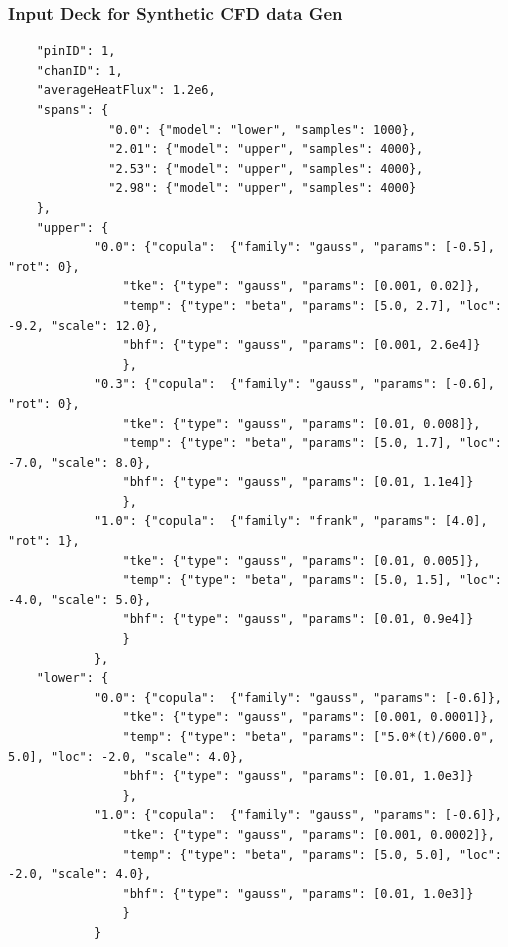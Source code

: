 \documentclass[t, pdftex]{beamer}
\begin{document}
\begin{frame}[fragile,shrink=30]
\frametitle{Input Deck for Synthetic CFD data Gen}
\begin{verbatim}
    "pinID": 1,
    "chanID": 1,
    "averageHeatFlux": 1.2e6,
    "spans": {
              "0.0": {"model": "lower", "samples": 1000},
              "2.01": {"model": "upper", "samples": 4000},
              "2.53": {"model": "upper", "samples": 4000},
              "2.98": {"model": "upper", "samples": 4000}
    },
    "upper": {
            "0.0": {"copula":  {"family": "gauss", "params": [-0.5], "rot": 0},
                "tke": {"type": "gauss", "params": [0.001, 0.02]},
                "temp": {"type": "beta", "params": [5.0, 2.7], "loc": -9.2, "scale": 12.0},
                "bhf": {"type": "gauss", "params": [0.001, 2.6e4]}
                },
            "0.3": {"copula":  {"family": "gauss", "params": [-0.6], "rot": 0},
                "tke": {"type": "gauss", "params": [0.01, 0.008]},
                "temp": {"type": "beta", "params": [5.0, 1.7], "loc": -7.0, "scale": 8.0},
                "bhf": {"type": "gauss", "params": [0.01, 1.1e4]}
                },
            "1.0": {"copula":  {"family": "frank", "params": [4.0], "rot": 1},
                "tke": {"type": "gauss", "params": [0.01, 0.005]},
                "temp": {"type": "beta", "params": [5.0, 1.5], "loc": -4.0, "scale": 5.0},
                "bhf": {"type": "gauss", "params": [0.01, 0.9e4]}
                }
            },
    "lower": {
            "0.0": {"copula":  {"family": "gauss", "params": [-0.6]},
                "tke": {"type": "gauss", "params": [0.001, 0.0001]},
                "temp": {"type": "beta", "params": ["5.0*(t)/600.0", 5.0], "loc": -2.0, "scale": 4.0},
                "bhf": {"type": "gauss", "params": [0.01, 1.0e3]}
                },
            "1.0": {"copula":  {"family": "gauss", "params": [-0.6]},
                "tke": {"type": "gauss", "params": [0.001, 0.0002]},
                "temp": {"type": "beta", "params": [5.0, 5.0], "loc": -2.0, "scale": 4.0},
                "bhf": {"type": "gauss", "params": [0.01, 1.0e3]}
                }
            }
\end{verbatim}
\end{frame}


\lastframe%
\end{document}
